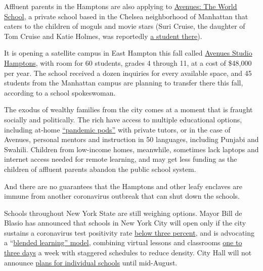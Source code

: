 Affluent parents in the Hamptons are also applying to
\href{https://www.avenues.org/}{Avenues: The World School}, a private
school based in the Chelsea neighborhood of Manhattan that caters to the
children of moguls and movie stars (Suri Cruise, the daughter of Tom
Cruise and Katie Holmes, was reportedly
\href{https://www.businessinsider.com/avenues-world-school-new-york-city-photos-tour-amenities-2019-4}{a
student there}).

It is opening a satellite campus in East Hampton this fall called
\href{https://studio.avenues.org/}{Avenues Studio Hamptons}, with room
for 60 students, grades 4 through 11, at a cost of \$48,000 per year.
The school received a dozen inquiries for every available space, and 45
students from the Manhattan campus are planning to transfer there this
fall, according to a school spokeswoman.

The exodus of wealthy families from the city comes at a moment that is
fraught socially and politically. The rich have access to multiple
educational options, including at-home
\href{https://www.nytimes3xbfgragh.onion/2020/07/22/parenting/school-pods-coronavirus.html}{``pandemic
pods''} with private tutors, or in the case of Avenues, personal mentors
and instruction in 50 languages, including Punjabi and Swahili. Children
from low-income homes, meanwhile, sometimes lack laptops and internet
access needed for remote learning, and may get less funding as the
children of affluent parents abandon the public school system.

And there are no guarantees that the Hamptons and other leafy enclaves
are immune from another coronavirus outbreak that can shut down the
schools.

Schools throughout New York State are still weighing options. Mayor Bill
de Blasio has announced that schools in New York City will open only if
the city sustains a coronavirus test positivity rate
\href{https://www.nytimes3xbfgragh.onion/2020/07/31/world/coronavirus-covid-19.html?action=click\&module=Top\%20Stories\&pgtype=Homepage\#link-22c71cd7}{below
three percent}, and is advocating a
``\href{https://www.nytimes3xbfgragh.onion/2020/07/08/nyregion/nyc-schools-reopening-plan.html}{blended
learning'' model}, combining virtual lessons and classrooms
\href{https://www.nytimes3xbfgragh.onion/2020/07/08/nyregion/nyc-schools-reopening-plan.html}{one
to three days} a week with staggered schedules to reduce density. City
Hall will not announce
\href{https://www.nbcnewyork.com/news/coronavirus/nyc-to-ask-state-for-extension-on-specific-back-to-school-plans/2540164/}{plans
for individual schools} until mid-August.

